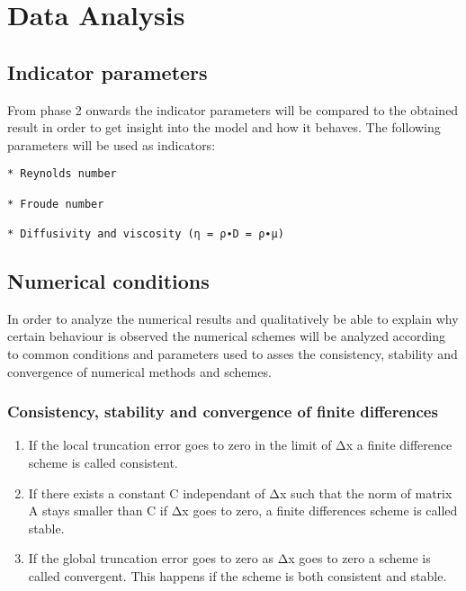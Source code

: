 \chapter{Data Analysis}\label{data-analysis}

\section{Indicator parameters}\label{indicator-parameters}

From phase 2 onwards the indicator parameters will be compared to the
obtained result in order to get insight into the model and how it
behaves. The following parameters will be used as indicators: 

\begin{verbatim}
* Reynolds number

* Froude number

* Diffusivity and viscosity (η = ρ∙D = ρ∙μ)
\end{verbatim}

\section{Numerical conditions}\label{numerical-conditions}

In order to analyze the numerical results and qualitatively be able to
explain why certain behaviour is observed the numerical schemes will be
analyzed according to common conditions and parameters used to asses the
consistency, stability and convergence of numerical methods and schemes.

\subsection{Consistency, stability and convergence of finite
differences}\label{consistency-stability-and-convergence-of-finite-differences}

\begin{enumerate}
\def\labelenumi{\arabic{enumi}.}
\item
  If the local truncation error goes to zero in the limit of Δx a finite
  difference scheme is called consistent.
\item
  If there exists a constant C independant of Δx such that the norm of
  matrix A stays smaller than C if Δx goes to zero, a finite differences
  scheme is called stable.
\item
  If the global truncation error goes to zero as Δx goes to zero a
  scheme is called convergent. This happens if the scheme is both
  consistent and stable.
\end{enumerate}

